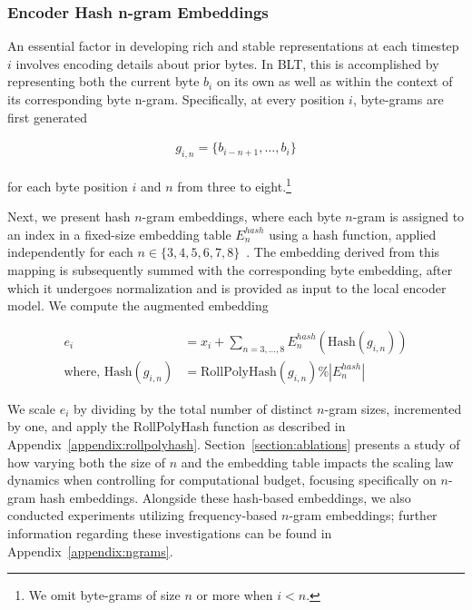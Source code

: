\subsubsection{Encoder Hash n-gram Embeddings}
\label{sec:ngram-emb}
\label{sec:hash-emb}
An essential factor in developing rich and stable representations at each timestep $i$ involves encoding details about prior bytes. In {\textsc BLT}, this is accomplished by representing both the current byte $b_i$ on its own as well as within the context of its corresponding byte n-gram. Specifically, at every position $i$, byte-grams are first generated

\begin{align}
    g_{i,n}=\{b_{i-n + 1},\ldots, b_i\}
\end{align}

for each byte position $i$ and $n$ from three to eight.\footnote{
We omit byte-grams of size $n$ or more when $i<n$. }

Next, we present hash $n$-gram embeddings, where each byte $n$-gram is assigned to an index in a fixed-size embedding table $E_{n}^{hash}$ using a hash function, applied independently for each $n \in \{3,4,5,6,7,8\}$~\citep{bai2010learning}. The embedding derived from this mapping is subsequently summed with the corresponding byte embedding, after which it undergoes normalization and is provided as input to the local encoder model. We compute the augmented embedding

\begin{align}
e_i &= x_i + \sum_{n = 3,...,8}E_{n}^{hash}(\text{Hash}(g_{i,n})) \\
\text{where, Hash}(g_{i,n}) &= \text{RollPolyHash}(g_{i,n}) \% |E_{n}^{hash}|
\end{align}

We scale $e_i$ by dividing by the total number of distinct $n$-gram sizes, incremented by one, and apply the RollPolyHash function as described in Appendix~\ref{appendix:rollpolyhash}. Section~\ref{section:ablations} presents a study of how varying both the size of $n$ and the embedding table impacts the scaling law dynamics when controlling for computational budget, focusing specifically on $n$-gram hash embeddings. Alongside these hash-based embeddings, we also conducted experiments utilizing frequency-based $n$-gram embeddings; further information regarding these investigations can be found in Appendix~\ref{appendix:ngrams}.

